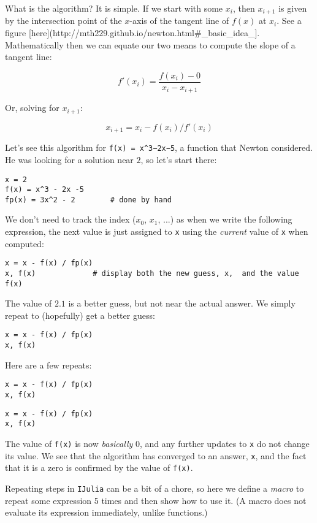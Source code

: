 \documentclass[12pt]{article}
\begin{document}
What is the algorithm? It is simple. If we start with some $x_i$, then
$x_{i+1}$ is given by the intersection point of the $x$-axis of the
tangent line of $f(x)$ at $x_i$. See a figure
{[}here{]}(http://mth229.github.io/newton.html\#\_basic\_idea\_{]}.
Mathematically then we can equate our two means to compute the slope of
a tangent line:

\[
f'(x_i) = \frac{f(x_i) - 0}{x_i - x_{i+1}}
\]

Or, solving for $x_{i+1}$:

\[
x_{i+1} = x_i - f(x_i)/f'(x_i)
\]

Let's see this algorithm for \texttt{f(x) = x\^{}3−2x−5}, a function
that Newton considered. He was looking for a solution near $2$, so let's
start there:



\begin{verbatim}
x = 2
f(x) = x^3 - 2x -5
fp(x) = 3x^2 - 2        # done by hand
\end{verbatim}
We don't need to track the index ($x_0$, $x_1$, ...) as when we write
the following expression, the next value is just assigned to \texttt{x}
using the \emph{current} value of \texttt{x} when computed:



\begin{verbatim}
x = x - f(x) / fp(x)
x, f(x)             # display both the new guess, x,  and the value f(x)
\end{verbatim}
The value of $2.1$ is a better guess, but not near the actual answer. We
simply repeat to (hopefully) get a better guess:



\begin{verbatim}
x = x - f(x) / fp(x)
x, f(x)
\end{verbatim}
Here are a few repeats:



\begin{verbatim}
x = x - f(x) / fp(x)
x, f(x)
\end{verbatim}


\begin{verbatim}
x = x - f(x) / fp(x)
x, f(x)
\end{verbatim}
The value of \texttt{f(x)} is now \emph{basically} 0, and any further
updates to \texttt{x} do not change its value. We see that the algorithm
has converged to an answer, \texttt{x}, and the fact that it is a zero
is confirmed by the value of \texttt{f(x)}.

Repeating steps in \texttt{IJulia} can be a bit of a chore, so here we
define a \emph{macro} to repeat some expression 5 times and then show
how to use it. (A macro does not evaluate its expression immediately,
unlike functions.)
\end{document}
